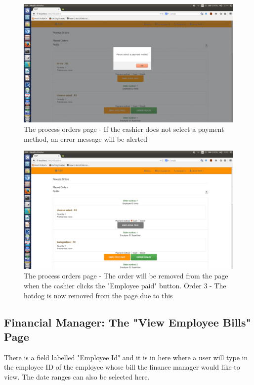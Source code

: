 \documentclass[a4paper,12pt]{report}
\begin{document}
\begin{figure}[H]
  \centering
    \includegraphics[width=1.0\textwidth]{screenshots/noPaymentMethSelected.png}
    \caption{The process orders page - If the cashier does not select a payment method, an error message will be alerted}
\end{figure}

\begin{figure}[H]
  \centering
    \includegraphics[width=1.0\textwidth]{screenshots/empPaid.png}
    \caption{The process orders page - The order will be removed from the page when the cashier clicks the "Employee paid" button. Order 3 - The hotdog is now removed from the page due to this}
\end{figure}

\subsection{Financial Manager: The "View Employee Bills" Page}
There is a field labelled "Employee Id" and it is in here where a user will type in the employee ID of the employee whose bill the finance manager would like to view. The date ranges can also be selected here.
\end{document}
